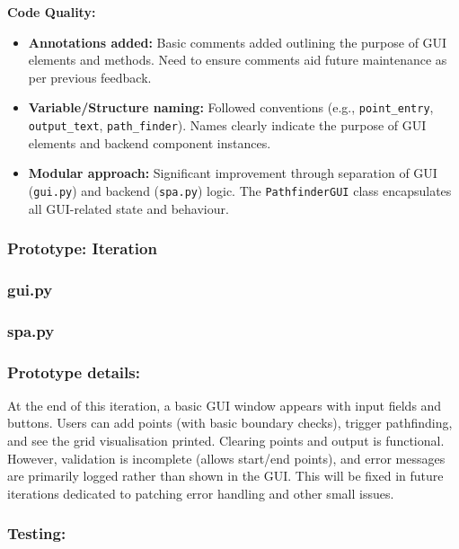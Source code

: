 \textbf{Code Quality:}
\begin{itemize}
	\item \textbf{Annotations added:} Basic comments added outlining the purpose of GUI elements and methods. Need to ensure comments aid future maintenance as per previous feedback.
	\item \textbf{Variable/Structure naming:} Followed conventions (e.g., \verb|point_entry|, \verb|output_text|, \verb|path_finder|). Names clearly indicate the purpose of GUI elements and backend component instances.
	\item \textbf{Modular approach:} Significant improvement through separation of GUI (\verb|gui.py|) and backend (\verb|spa.py|) logic. The \verb|PathfinderGUI| class encapsulates all GUI-related state and behaviour.
\end{itemize}

\newpage %

\subsubsection*{Prototype: Iteration}
\subsubsection{gui.py}


\subsubsection{spa.py}



\subsubsection{Prototype details:}
At the end of this iteration, a basic GUI window appears with input fields and buttons. Users can add points (with basic boundary checks), trigger pathfinding, and see the grid visualisation printed. Clearing points and output is functional. However, validation is incomplete (allows start/end points), and error messages are primarily logged rather than shown in the GUI. This will be fixed in future iterations dedicated to patching error handling and other small issues.

\subsubsection{Testing:}

